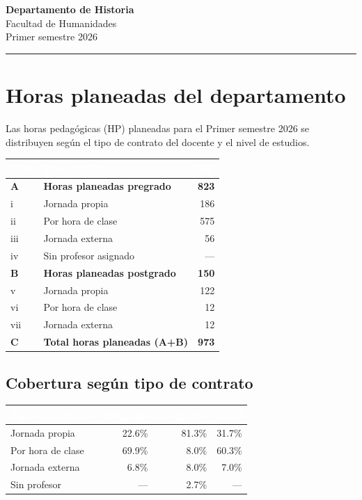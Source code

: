 \documentclass[11pt, a4paper]{article}
\begin{document}
\begin{center}
  {\Large\bfseries\color{usachDark} Departamento de Historia} \\[0.4em]
  {\large\color{usachTeal} Facultad de Humanidades} \\[0.2em]
  {\normalsize\color{gray} Primer semestre 2026}
\end{center}
\vspace{0.5em}
\textcolor{usachTeal}{\rule{\linewidth}{2pt}}
\vspace{1em}

\section{Horas planeadas del departamento}

Las horas pedagógicas (HP) planeadas para el Primer semestre 2026 se distribuyen según el tipo de contrato del docente y el nivel de estudios.

\begin{tabularx}{\linewidth}{l X r}
\toprule
\rowcolor{usachDark} \textbf{\textcolor{white}{Cód.}} & \textbf{\textcolor{white}{Descripción}} & \textbf{\textcolor{white}{HP}} \\
\midrule
\rowcolor{rowHighlight}\textbf{A} & \textbf{Horas planeadas pregrado} & \textbf{823} \\
\rowcolor{rowEven}i & Jornada propia & 186 \\
ii & Por hora de clase & 575 \\
\rowcolor{rowEven}iii & Jornada externa & 56 \\
iv & Sin profesor asignado & --- \\
\rowcolor{rowHighlight}\textbf{B} & \textbf{Horas planeadas postgrado} & \textbf{150} \\
v & Jornada propia & 122 \\
\rowcolor{rowEven}vi & Por hora de clase & 12 \\
vii & Jornada externa & 12 \\
\rowcolor{rowHighlight}\textbf{C} & \textbf{Total horas planeadas (A+B)} & \textbf{973} \\
\bottomrule
\end{tabularx}

\subsection{Cobertura según tipo de contrato}

\begin{tabular}{lrrr}
\toprule
\rowcolor{usachDark} \textbf{\textcolor{white}{Tipo de contrato}} & \textbf{\textcolor{white}{Pregrado}} & \textbf{\textcolor{white}{Postgrado}} & \textbf{\textcolor{white}{Total}} \\
\midrule
Jornada propia & 22.6\% & 81.3\% & 31.7\% \\
\rowcolor{rowEven}Por hora de clase & 69.9\% & 8.0\% & 60.3\% \\
Jornada externa & 6.8\% & 8.0\% & 7.0\% \\
\rowcolor{rowEven}Sin profesor & --- & 2.7\% & --- \\
\bottomrule
\end{tabular}
\end{document}
